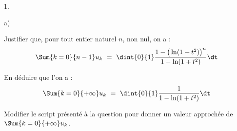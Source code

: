 \documentclass[11pt]{article}%
\begin{document}
\begin{noliste}{1.}
\begin{noliste}{a)}
    

  \item Justifier que, pour tout entier naturel $n$, non nul, on a :
    \[
    \Sum{k = 0}{n-1} u_k \ = \ \dint{0}{1} \dfrac{1 - \big( \ln(1 +
      t^2) \big)^n}{1 - \ln(1 + t^2)} \dt
    \]

    




  \item En déduire que l'on a : 
    \[
    \Sum{k = 0}{+\infty} u_k \ = \ \dint{0}{1} \dfrac{1}{1 - \ln(1 +
      t^2)} \dt
    \]

    

  \item Modifier le script présenté à la question  pour
    donner un valeur approchée de $\Sum{k = 0}{+\infty} u_k$.

    
  \end{noliste}  

\end{noliste}
\end{document}
